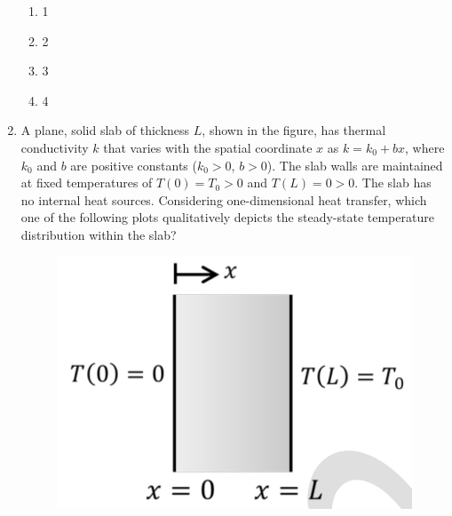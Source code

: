 \documentclass[journal,11pt,onecolumn]{IEEEtran}
\begin{document}
\begin{enumerate}[resume]
          \begin{enumerate}
              \item 1
              \item 2
              \item 3
              \item 4
          \end{enumerate}

    \item A plane, solid slab of thickness $L$, shown in the figure, has thermal conductivity $k$ that varies with the spatial coordinate $x$ as $k = k_0 + bx$, where $k_0$ and $b$ are positive constants ($k_0 > 0$, $b > 0$). The slab walls are maintained at fixed temperatures of $T(0) = T_0 > 0$ and $T(L) = 0 > 0$. The slab has no internal heat sources. Considering one-dimensional heat transfer, which one of the following plots qualitatively depicts the steady-state temperature distribution within the slab?

          \begin{figure}[H]
              \centering
              \includegraphics[scale=0.2]{q17}
              \caption{}
              \label{fig:q17}
          \end{figure}


\end{enumerate}
\end{document}
